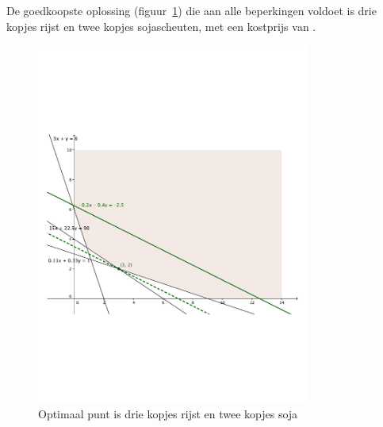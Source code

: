 \begin{Oplossing}{4.1}
     De goedkoopste oplossing (figuur~\ref{fig:oplrijstsoja}) die aan alle beperkingen voldoet is drie kopjes rijst en twee kopjes sojascheuten, met een kostprijs van .
     \begin{figure}[hbtp]
\centering
\includegraphics[width=0.8\textwidth]{oefeningen/FigurenLP/OefRijstSoja.pdf}
\caption{Optimaal punt is drie kopjes rijst en twee kopjes soja}
\label{fig:oplrijstsoja}
\end{figure}

     
\end{Oplossing}
